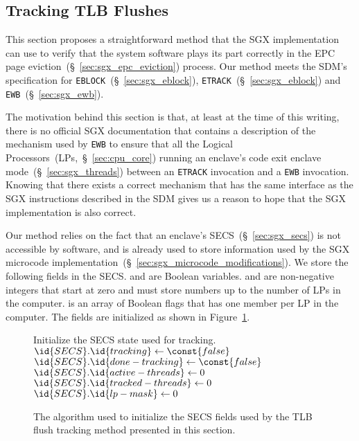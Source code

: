 \subsection{Tracking TLB Flushes}
\label{sec:sgx_ewb_guess}

This section proposes a straightforward method that the SGX implementation can
use to verify that the system software plays its part correctly in the EPC page
eviction~(\S~\ref{sec:sgx_epc_eviction}) process. Our method meets the SDM's
specification for \texttt{EBLOCK}~(\S~\ref{sec:sgx_eblock}),
\texttt{ETRACK}~(\S~\ref{sec:sgx_eblock}) and
\texttt{EWB}~(\S~\ref{sec:sgx_ewb}).

The motivation behind this section is that, at least at the time of this
writing, there is no official SGX documentation that contains a description of
the mechanism used by \texttt{EWB} to ensure that all the Logical
Processors~(LPs,~\S~\ref{sec:cpu_core}) running an enclave's code exit enclave
mode~(\S~\ref{sec:sgx_threads}) between an \texttt{ETRACK} invocation and a
\texttt{EWB} invocation. Knowing that there exists a correct mechanism that has
the same interface as the SGX instructions described in the SDM gives us a
reason to hope that the SGX implementation is also correct.

Our method relies on the fact that an enclave's SECS~(\S~\ref{sec:sgx_secs}) is
not accessible by software, and is already used to store information used by
the SGX microcode implementation~(\S~\ref{sec:sgx_microcode_modifications}).
We store the following fields in the SECS.  and
 are Boolean variables.  and
 are non-negative integers that start at zero and must store
numbers up to the number of LPs in the computer.  is an array of
Boolean flags that has one member per LP in the computer. The fields are
initialized as shown in Figure~\ref{fig:sgx_tracking_ecreate}.

\begin{figure}[hbt]
  \begin{codebox}
  \zi \Comment Initialize the SECS state used for tracking.
  \li $\id{SECS}.\id{tracking} \gets \const{false}$
  \li $\id{SECS}.\id{done-tracking} \gets \const{false}$
  \li $\id{SECS}.\id{active-threads} \gets 0$
  \li $\id{SECS}.\id{tracked-threads} \gets 0$
  \li $\id{SECS}.\id{lp-mask} \gets 0$
  \end{codebox}
  \caption{
    The algorithm used to initialize the SECS fields used by the TLB flush
    tracking method presented in this section.
  }
  \label{fig:sgx_tracking_ecreate}
\end{figure}

